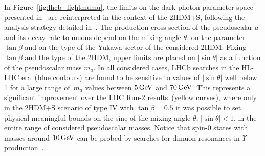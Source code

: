 In Figure~\ref{fig:lhcb_lightmumu}, the limits on the dark photon parameter space presented in~\cite{Bediaga:2018lhg} are reinterpreted in the context of the 2HDM+S, following the analysis strategy detailed in~\cite{Haisch:2018kqx}. The production cross section of the pseudoscalar $a$ and its decay rate to muons depend on the mixing angle $\theta$, on the parameter $\tan\beta$ and on the type of the Yukawa sector of the considered 2HDM. Fixing $\tan\beta$ and the type of the 2HDM, upper limits are placed on $|\!\sin\theta|$ as a function of the pseudoscalar mass $m_a$. In all considered cases, LHCb searches in the HL-LHC era~(blue contours) are found to be sensitive to values of $|\!\sin\theta|$ well below 1 for a large range of~$m_a$ values between $5 \, {\rm GeV}$ and $70 \, {\rm GeV}$. This represents a significant improvement over the LHC Run-2 results~(yellow curves), where only in the 2HDM+S scenario of type IV with $\tan \beta = 0.5$ it was possible to set physical meaningful bounds on the sine of the mixing angle $\theta$, \ie $|\!\sin\theta| < 1$, in the entire range of considered pseudoscalar masses. Notice that spin-0 states with masses around $10 \, {\rm GeV}$ can be probed by searches for dimuon resonances in $\Upsilon$ production~\cite{Haisch:2016hzu,Aaij:2018xpt}.

\clearpage

